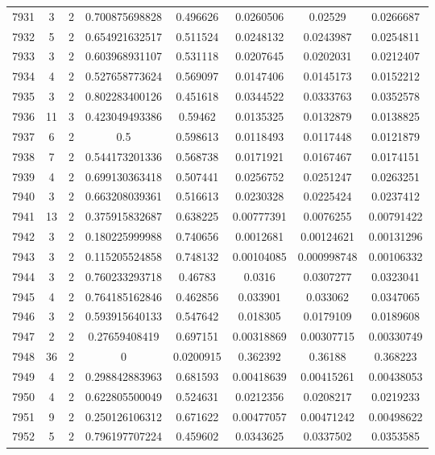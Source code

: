 \begin{longtable}{|c|c|c|c|c|c|c|c|}
7931 & 3 & 2 & 0.700875698828 & 0.496626 & 0.0260506 & 0.02529 & 0.0266687 \\
7932 & 5 & 2 & 0.654921632517 & 0.511524 & 0.0248132 & 0.0243987 & 0.0254811 \\
7933 & 3 & 2 & 0.603968931107 & 0.531118 & 0.0207645 & 0.0202031 & 0.0212407 \\
7934 & 4 & 2 & 0.527658773624 & 0.569097 & 0.0147406 & 0.0145173 & 0.0152212 \\
7935 & 3 & 2 & 0.802283400126 & 0.451618 & 0.0344522 & 0.0333763 & 0.0352578 \\
7936 & 11 & 3 & 0.423049493386 & 0.59462 & 0.0135325 & 0.0132879 & 0.0138825 \\
7937 & 6 & 2 & 0.5 & 0.598613 & 0.0118493 & 0.0117448 & 0.0121879 \\
7938 & 7 & 2 & 0.544173201336 & 0.568738 & 0.0171921 & 0.0167467 & 0.0174151 \\
7939 & 4 & 2 & 0.699130363418 & 0.507441 & 0.0256752 & 0.0251247 & 0.0263251 \\
7940 & 3 & 2 & 0.663208039361 & 0.516613 & 0.0230328 & 0.0225424 & 0.0237412 \\
7941 & 13 & 2 & 0.375915832687 & 0.638225 & 0.00777391 & 0.0076255 & 0.00791422 \\
7942 & 3 & 2 & 0.180225999988 & 0.740656 & 0.0012681 & 0.00124621 & 0.00131296 \\
7943 & 3 & 2 & 0.115205524858 & 0.748132 & 0.00104085 & 0.000998748 & 0.00106332 \\
7944 & 3 & 2 & 0.760233293718 & 0.46783 & 0.0316 & 0.0307277 & 0.0323041 \\
7945 & 4 & 2 & 0.764185162846 & 0.462856 & 0.033901 & 0.033062 & 0.0347065 \\
7946 & 3 & 2 & 0.593915640133 & 0.547642 & 0.018305 & 0.0179109 & 0.0189608 \\
7947 & 2 & 2 & 0.27659408419 & 0.697151 & 0.00318869 & 0.00307715 & 0.00330749 \\
7948 & 36 & 2 & 0 & 0.0200915 & 0.362392 & 0.36188 & 0.368223 \\
7949 & 4 & 2 & 0.298842883963 & 0.681593 & 0.00418639 & 0.00415261 & 0.00438053 \\
7950 & 4 & 2 & 0.622805500049 & 0.524631 & 0.0212356 & 0.0208217 & 0.0219233 \\
7951 & 9 & 2 & 0.250126106312 & 0.671622 & 0.00477057 & 0.00471242 & 0.00498622 \\
7952 & 5 & 2 & 0.796197707224 & 0.459602 & 0.0343625 & 0.0337502 & 0.0353585 \\

\end{longtable}
